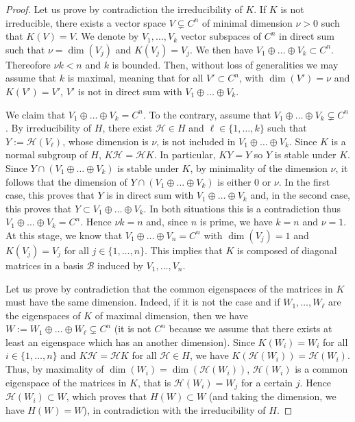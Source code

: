 \documentclass[a4paper,11pt]{amsart}
\begin{document}
\begin{proof}
Let us prove by contradiction the irreducibility of $K$. If $K$ is not irreducible, there exists a vector space $V\subsetneq C^n$ of minimal dimension $\nu>0$ such that $K(V)=V$.  
We denote by $V_1,\dots, V_k$  vector subspaces of $C^n$ in direct sum such that $\nu=\dim(V_j)$ and $K(V_j)=V_j$.  We then have $V_1\oplus \dots \oplus V_k\subset C^n$. Thereofore $\nu k< n$ and $k$ is bounded. Then, without loss of generalities we may assume that $k$ is maximal, meaning that for all $V'\subset C^n$, with $\dim (V')=\nu$ and $K(V')=V'$, $V'$ is not in direct sum with $V_1\oplus \dots \oplus V_k$.

We claim that  $V_1\oplus \dots \oplus V_k =C^n$.  To the contrary, assume that $V_1\oplus \dots \oplus V_k \subsetneq C^n$. By irreducibility of $H$, there exist $\mathscr{H}\in H$ and $\ell\in\lbrace 1,\ldots,k\rbrace$ such that $Y:=\mathscr{H}(V_\ell)$, whose dimension is $\nu$, is not included in $V_1\oplus \dots \oplus V_k$. Since $K$ is a normal subgroup of $H$, $K\mathscr{H}=\mathscr{H}K$. In particular, $KY=Y$ so $Y$ is stable under $K$.  
Since $Y\cap (V_1\oplus \dots \oplus V_k)$ is stable under $K$, by minimality of the dimension $\nu$, it follows that the dimension of $Y\cap (V_1\oplus \dots \oplus V_k)$ is either $0$ or $\nu$. In the first case, this proves that $Y$ is in direct sum with $V_1\oplus \dots \oplus V_k$ and, in 
the second case, this proves that $Y \subset V_1\oplus \dots \oplus V_k$. In both situations this is a contradiction thus $V_1\oplus \dots \oplus V_k= C^n$. Hence $\nu k=n$ and, since $n$ is prime, we have $k=n$ and $\nu=1$. 
At this stage, we know that $V_1\oplus \dots \oplus V_n= C^n$ with $\dim(V_j)=1$ and $K(V_j)=V_j$ for all $j\in\lbrace 1,\ldots,n\rbrace$. This implies that $K$ is composed of diagonal matrices in a basis $\mathcal{B}$ induced by $V_1,\ldots,V_n$. 

Let us prove by contradiction that the common eigenspaces of the matrices in $K$ must have the same dimension. Indeed, 
if it is not the case and if $W_1,\ldots,W_\ell$ are the eigenspaces of $K$ of maximal dimension, then we have $W:=W_1\oplus\ldots\oplus W_\ell\subsetneq C^n$ (it is not $C^n$ because we assume that there exists at least an eigenspace which has an another dimension). Since $K(W_i)=W_i$  for all $i\in\lbrace 1,\ldots,n\rbrace$ and  $K\mathscr{H}=\mathscr{H}K$ for all $\mathscr{H}\in H$, we have $K(\mathscr{H}(W_i))=\mathscr{H}(W_i)$. Thus, by maximality of $\dim(W_i)=\dim(\mathscr{H}(W_i))$, $\mathscr{H}(W_i)$ is a common eigenspace of the matrices in $K$, that is $\mathscr{H}(W_i)=W_j$ for a certain $j$. Hence  $\mathscr{H}(W_i)\subset W$, which proves that $H(W)\subset W$ (and taking the dimension, we have $H(W)=W$), in contradiction with the irreducibility of $H$. 


\end{proof}
\end{document}
